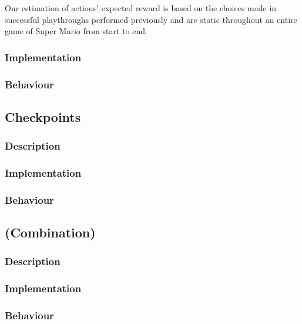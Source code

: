 \documentclass[10pt,a4paper]{article}
\begin{document}
Our estimation of actions' expected reward is based on the choices made in successful playthroughs performed previously and are static throughout an entire game of Super Mario from start to end.

\subsubsection*{Implementation}


\subsubsection*{Behaviour}
\subsection{Checkpoints}
\subsubsection*{Description}
\subsubsection*{Implementation}
\subsubsection*{Behaviour}
\subsection{(Combination)}
\subsubsection*{Description}
\subsubsection*{Implementation}
\subsubsection*{Behaviour}

\clearpage
\end{document}
